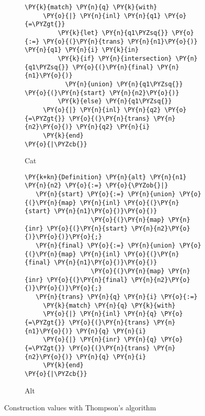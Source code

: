\begin{figure}
\begin{minipage}{0.6\textwidth}
\begin{subfigure}{1.0\textwidth}
\begin{Verbatim}[commandchars=\\\{\}]
     \PY{k}{match} \PY{n}{q} \PY{k}{with}
     \PY{o}{|} \PY{n}{inl} \PY{n}{q1} \PY{o}{=\PYZgt{}}
         \PY{k}{let} \PY{n}{q1\PYZsq{}} \PY{o}{:=} \PY{o}{(}\PY{n}{trans} \PY{n}{n1}\PY{o}{)} \PY{n}{q1} \PY{n}{i} \PY{k}{in}
         \PY{k}{if} \PY{n}{intersection} \PY{n}{q1\PYZsq{}} \PY{o}{(}\PY{n}{final} \PY{n}{n1}\PY{o}{)}
           \PY{n}{union} \PY{n}{q1\PYZsq{}} \PY{o}{(}\PY{n}{start} \PY{n}{n2}\PY{o}{)}
         \PY{k}{else} \PY{n}{q1\PYZsq{}}
     \PY{o}{|} \PY{n}{inl} \PY{n}{q2} \PY{o}{=\PYZgt{}} \PY{o}{(}\PY{n}{trans} \PY{n}{n2}\PY{o}{)} \PY{n}{q2} \PY{n}{i}
     \PY{k}{end}
\PY{o}{|\PYZcb{}}
\end{Verbatim}
\caption{Cat}
\vspace{3em}
\end{subfigure}
%
\begin{subfigure}{1.0\textwidth}
  \centering
\begin{Verbatim}[commandchars=\\\{\}]
\PY{k+kn}{Definition} \PY{n}{alt} \PY{n}{n1} \PY{n}{n2} \PY{o}{:=} \PY{o}{\PYZob{}|}
   \PY{n}{start} \PY{o}{:=} \PY{n}{union} \PY{o}{(}\PY{n}{map} \PY{n}{inl} \PY{o}{(}\PY{n}{start} \PY{n}{n1}\PY{o}{)}\PY{o}{)}
                  \PY{o}{(}\PY{n}{map} \PY{n}{inr} \PY{o}{(}\PY{n}{start} \PY{n}{n2}\PY{o}{)}\PY{o}{)}\PY{o}{;}
   \PY{n}{final} \PY{o}{:=} \PY{n}{union} \PY{o}{(}\PY{n}{map} \PY{n}{inl} \PY{o}{(}\PY{n}{final} \PY{n}{n1}\PY{o}{)}\PY{o}{)}
                  \PY{o}{(}\PY{n}{map} \PY{n}{inr} \PY{o}{(}\PY{n}{final} \PY{n}{n2}\PY{o}{)}\PY{o}{)}\PY{o}{;}
   \PY{n}{trans} \PY{n}{q} \PY{n}{i} \PY{o}{:=}
     \PY{k}{match} \PY{n}{q} \PY{k}{with}
     \PY{o}{|} \PY{n}{inl} \PY{n}{q} \PY{o}{=\PYZgt{}} \PY{o}{(}\PY{n}{trans} \PY{n}{n1}\PY{o}{)} \PY{n}{q} \PY{n}{i}
     \PY{o}{|} \PY{n}{inr} \PY{n}{q} \PY{o}{=\PYZgt{}} \PY{o}{(}\PY{n}{trans} \PY{n}{n2}\PY{o}{)} \PY{n}{q} \PY{n}{i}
     \PY{k}{end}
\PY{o}{|\PYZcb{}}
\end{Verbatim}
\caption{Alt}
\end{subfigure}
\end{minipage}
%
\caption{Construction  values with Thompson's algorithm}
\label{fig:nfacon-nfa-vals}
\end{figure}
